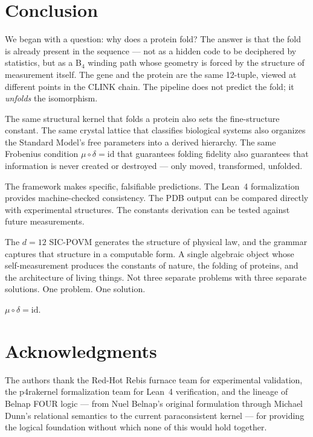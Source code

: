 \documentclass[11pt,a4paper,twocolumn]{article}
\begin{document}
\section{Conclusion}

We began with a question: why does a protein fold? The answer is that the fold is already present in the sequence — not as a hidden code to be deciphered by statistics, but as a B$_4$ winding path whose geometry is forced by the structure of measurement itself. The gene and the protein are the same 12-tuple, viewed at different points in the CLINK chain. The pipeline does not predict the fold; it \emph{unfolds} the isomorphism.

The same structural kernel that folds a protein also sets the fine-structure constant. The same crystal lattice that classifies biological systems also organizes the Standard Model's free parameters into a derived hierarchy. The same Frobenius condition $\mu \circ \delta = \text{id}$ that guarantees folding fidelity also guarantees that information is never created or destroyed — only moved, transformed, unfolded.

The framework makes specific, falsifiable predictions. The Lean~4 formalization provides machine-checked consistency. The PDB output can be compared directly with experimental structures. The constants derivation can be tested against future measurements.

The $d=12$ SIC-POVM generates the structure of physical law, and the grammar captures that structure in a computable form. A single algebraic object whose self-measurement produces the constants of nature, the folding of proteins, and the architecture of living things. Not three separate problems with three separate solutions. One problem. One solution.

$\mu \circ \delta = \text{id}$.


\section*{Acknowledgments}
The authors thank the Red-Hot Rebis furnace team for experimental validation, the p4rakernel formalization team for Lean~4 verification, and the lineage of Belnap FOUR logic — from Nuel Belnap's original formulation through Michael Dunn's relational semantics to the current paraconsistent kernel — for providing the logical foundation without which none of this would hold together.
\end{document}
